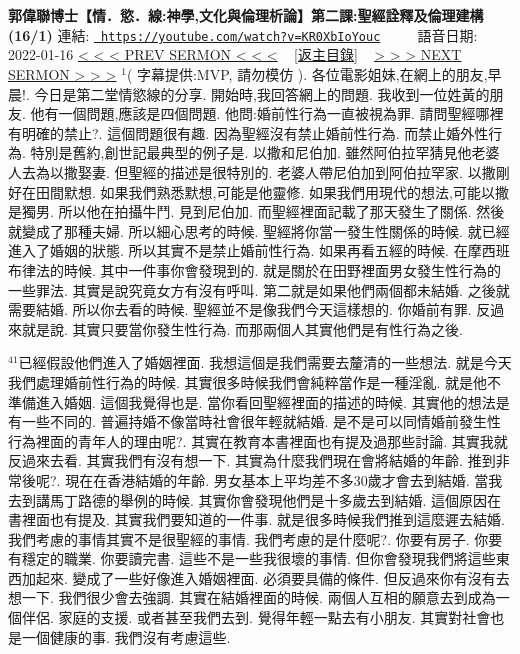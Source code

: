 \documentclass{book}
\begin{document}
\section{}
\label{sec:KR0XbIoYouc}
\textbf{郭偉聯博士【情．慾．線:神學,文化與倫理析論】第二課:聖經詮釋及倫理建構 (16/1)}
\newline
\newline
連結: \href{https://youtube.com/watch?v=KR0XbIoYouc}{\texttt{ https://youtube.com/watch?v=KR0XbIoYouc}} ~~~~ 語音日期: 2022-01-16 
\newline
\newline
\hyperref[sec:wqj8hNAtWGc]{\small{< < < PREV SERMON < < <}}
~
\hyperref[sec:index]{\small{[返主目錄]}}
~
\hyperref[sec:hNm147B1MpE]{\small{> > > NEXT SERMON > > >}}
\newline
\newline
$^{1}$( 字幕提供:MVP, 請勿模仿 ).
各位電影姐妹,在網上的朋友,早晨!.
今日是第二堂情慾線的分享.
開始時,我回答網上的問題.
我收到一位姓黃的朋友.
他有一個問題,應該是四個問題.
他問:婚前性行為一直被視為罪.
請問聖經哪裡有明確的禁止?.
這個問題很有趣.
因為聖經沒有禁止婚前性行為.
而禁止婚外性行為.
特別是舊約,創世記最典型的例子是.
以撒和尼伯加.
雖然阿伯拉罕猜見他老婆人去為以撒娶妻.
但聖經的描述是很特別的.
老婆人帶尼伯加到阿伯拉罕家.
以撒剛好在田間默想.
如果我們熟悉默想,可能是他靈修.
如果我們用現代的想法,可能以撒是獨男.
所以他在拍攝牛鬥.
見到尼伯加.
而聖經裡面記載了那天發生了關係.
然後就變成了那種夫婦.
所以細心思考的時候.
聖經將你當一發生性關係的時候.
就已經進入了婚姻的狀態.
所以其實不是禁止婚前性行為.
如果再看五經的時候.
在摩西班布律法的時候.
其中一件事你會發現到的.
就是關於在田野裡面男女發生性行為的一些罪法.
其實是說究竟女方有沒有呼叫.
第二就是如果他們兩個都未結婚.
之後就需要結婚.
所以你去看的時候.
聖經並不是像我們今天這樣想的.
你婚前有罪.
反過來就是說.
其實只要當你發生性行為.
而那兩個人其實他們是有性行為之後.

$^{41}$已經假設他們進入了婚姻裡面.
我想這個是我們需要去釐清的一些想法.
就是今天我們處理婚前性行為的時候.
其實很多時候我們會純粹當作是一種淫亂.
就是他不準備進入婚姻.
這個我覺得也是.
當你看回聖經裡面的描述的時候.
其實他的想法是有一些不同的.
普遍持婚不像當時社會很年輕就結婚.
是不是可以同情婚前發生性行為裡面的青年人的理由呢?.
其實在教育本書裡面也有提及過那些討論.
其實我就反過來去看.
其實我們有沒有想一下.
其實為什麼我們現在會將結婚的年齡.
推到非常後呢?.
現在在香港結婚的年齡.
男女基本上平均差不多30歲才會去到結婚.
當我去到講馬丁路德的舉例的時候.
其實你會發現他們是十多歲去到結婚.
這個原因在書裡面也有提及.
其實我們要知道的一件事.
就是很多時候我們推到這麼遲去結婚.
我們考慮的事情其實不是很聖經的事情.
我們考慮的是什麼呢?.
你要有房子.
你要有穩定的職業.
你要讀完書.
這些不是一些我很壞的事情.
但你會發現我們將這些東西加起來.
變成了一些好像進入婚姻裡面.
必須要具備的條件.
但反過來你有沒有去想一下.
我們很少會去強調.
其實在結婚裡面的時候.
兩個人互相的願意去到成為一個伴侶.
家庭的支援.
或者甚至我們去到.
覺得年輕一點去有小朋友.
其實對社會也是一個健康的事.
我們沒有考慮這些.
\end{document}
